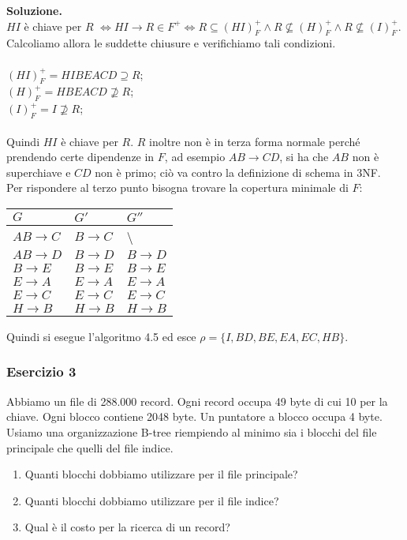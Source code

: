  \noindent\textbf{\fontsize{14pt}{1em}Soluzione.}\\
 $HI$ è chiave per $R$ $\Leftrightarrow HI \rightarrow R\in F^+ \Leftrightarrow R \subseteq (HI)^+_F \wedge
 R \not\subseteq (H)^+_F \wedge R \not\subseteq (I)^+_F$. Calcoliamo allora le suddette chiusure 
 e verifichiamo tali condizioni.\\\\
 $(HI)^+_F = HIBEACD \supseteq R$;\\
 $(H)^+_F = HBEACD \not\supseteq R$;\\
 $(I)^+_F = I \not\supseteq R$;\\\\
Quindi $HI$ è chiave per $R$. $R$ inoltre non è in terza forma normale perché prendendo certe dipendenze in $F$, ad esempio 
$AB \rightarrow CD$, si ha che $AB$ non è superchiave e $CD$ non è primo; ciò va contro la definizione di schema in 3NF.\\
Per rispondere al terzo punto bisogna trovare la copertura minimale di $F$:
\begin{center}
 \begin{tabular}{l|l|l}
  $G$ & $G'$ & $G''$\\
  \hline
  $AB\rightarrow C$ & $B\rightarrow C$ & \textbackslash \\
  $AB \rightarrow D$ & $B \rightarrow D$ & $B \rightarrow D$\\
  $B \rightarrow E$ & $B \rightarrow E$ & $B \rightarrow E$\\ 
  $E \rightarrow A$ & $E \rightarrow A$ & $E \rightarrow A$\\
  $E \rightarrow C$ & $E \rightarrow C$ & $E \rightarrow C$\\
  $H \rightarrow B$ & $H \rightarrow B$ & $H \rightarrow B$\\ 
 \end{tabular}
\end{center}
Quindi si esegue l'algoritmo 4.5 ed esce $\rho= \{I, BD, BE, EA, EC, HB\}$.

\subsubsection{Esercizio 3}
Abbiamo un file di 288.000 record. Ogni record occupa 49 byte di cui 10 per la chiave. Ogni blocco contiene 2048 byte. 
Un puntatore a blocco occupa 4 byte. Usiamo una organizzazione B-tree riempiendo al minimo sia i blocchi del file 
principale che quelli del file indice.
\begin{enumerate}
 \item Quanti blocchi dobbiamo utilizzare per il file principale? 
 \item Quanti blocchi dobbiamo utilizzare per il file indice?
 \item Qual è il costo per la ricerca di un record? 
\end{enumerate}

